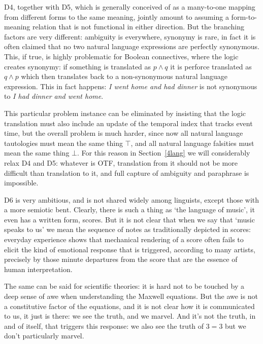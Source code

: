 \documentclass[output=paper,colorlinks=true,citecolor=brown]{langscibook}
\begin{document}
D4, together with D5, which is generally conceived of as a many-to-one mapping
from different forms to the same meaning, jointly amount to assuming a
form-to-meaning relation that is not functional in either direction. But the
branching factors are very different: ambiguity is everywhere, synonymy is
rare, in fact it is often claimed that no two natural language expressions are
perfectly synonymous. This, if true, is highly problematic for Boolean
connectives, where the logic creates synonymy: if something is translated as
$p \wedge q$ it is perforce translated as $q \wedge p$ which then translates
back to a non-synonymous natural language expression. This in fact happens:
{\it I went home and had dinner} is not synonymous to {\it I had dinner and
  went home}.

This particular problem instance can be eliminated by insisting that the logic
translation must also include an update of the temporal index that tracks event
time, but the overall problem is much harder, since now all natural language
tautologies must mean the same thing $\top$, and all natural language
falsities must mean the same thing $\bot$. For this reason in
Section~\ref{4lang} we will considerably relax D4 and D5: whatever is OTF,
translation from it should not be more difficult than translation to it, and
full capture of ambiguity and paraphrase is impossible. 

\medskip\noindent D6 is very ambitious, and is not shared widely among
linguists, except those with a more semiotic bent. Clearly, there is such a
thing as `the language of music', it even has a written form, scores. But it
is not clear that when we say that `music speaks to us' we mean the sequence
of notes as traditionally depicted in scores: everyday experience shows that
mechanical rendering of a score often fails to elicit the kind of emotional
response that is triggered, according to many artists, precisely by those minute
departures from the score that are the essence of human interpretation.

The same can be said for scientific theories: it is hard not to be touched by
a deep sense of awe when understanding the Maxwell equations. But the awe is
not a constitutive factor of the equations, and it is not clear how it is
communicated to us, it just is there: we see the truth, and we marvel. And
it's not the truth, in and of itself, that triggers this response: we also see
the truth of $3=3$ but we don't particularly marvel.
\end{document}
